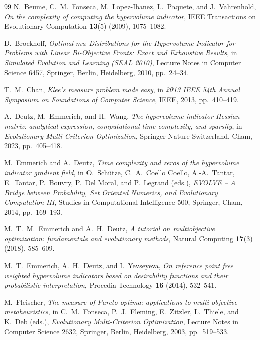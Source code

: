 \documentclass{article}
\def\mu{mu}%
\theoremstyle{definition}
\newcommand{\1}{\mathbf{1}}
\begin{document}
\begin{thebibliography}{99}
N.~Beume, C.~M.~Fonseca, M.~Lopez-Ibanez, L.~Paquete, and J.~Vahrenhold,
\emph{On the complexity of computing the hypervolume indicator},
IEEE Transactions on Evolutionary Computation \textbf{13}(5) (2009), 1075--1082.

D.~Brockhoff,
\emph{Optimal $\mu$-Distributions for the Hypervolume Indicator for Problems with Linear Bi-Objective Fronts: Exact and Exhaustive Results},
in \emph{Simulated Evolution and Learning (SEAL 2010)}, Lecture Notes in Computer Science 6457, Springer, Berlin, Heidelberg, 2010, pp.~24--34.

T.~M.~Chan,
\emph{Klee's measure problem made easy},
in \emph{2013 IEEE 54th Annual Symposium on Foundations of Computer Science}, IEEE, 2013, pp.~410--419.

A.~Deutz, M.~Emmerich, and H.~Wang,
\emph{The hypervolume indicator Hessian matrix: analytical expression, computational time complexity, and sparsity},
in \emph{Evolutionary Multi-Criterion Optimization}, Springer Nature Switzerland, Cham, 2023, pp.~405--418.

M.~Emmerich and A.~Deutz,
\emph{Time complexity and zeros of the hypervolume indicator gradient field},
in O.~Sch\"utze, C.~A.~Coello Coello, A.-A.~Tantar, E.~Tantar, P.~Bouvry, P.~Del Moral, and P.~Legrand (eds.),
\emph{EVOLVE -- A Bridge between Probability, Set Oriented Numerics, and Evolutionary Computation III},
Studies in Computational Intelligence 500, Springer, Cham, 2014, pp.~169--193.

M.~T.~M.~Emmerich and A.~H.~Deutz,
\emph{A tutorial on multiobjective optimization: fundamentals and evolutionary methods},
Natural Computing \textbf{17}(3) (2018), 585--609.

M.~T.~Emmerich, A.~H.~Deutz, and I.~Yevseyeva,
\emph{On reference point free weighted hypervolume indicators based on desirability functions and their probabilistic interpretation},
Procedia Technology \textbf{16} (2014), 532--541.

M.~Fleischer,
\emph{The measure of Pareto optima: applications to multi-objective metaheuristics},
in C.~M.~Fonseca, P.~J.~Fleming, E.~Zitzler, L.~Thiele, and K.~Deb (eds.),
\emph{Evolutionary Multi-Criterion Optimization}, Lecture Notes in Computer Science 2632, Springer, Berlin, Heidelberg, 2003, pp.~519--533.


\end{thebibliography}
\end{document}
